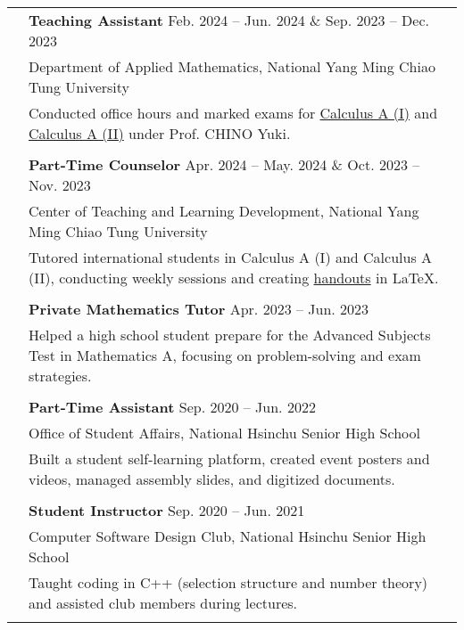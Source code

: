 \documentclass[letterpaper, 11pt]{article}
\begin{document}
\begin{center}
\begin{longtable}{p{0.76in}p{5.93in}}
        & \textbf{Teaching Assistant}  \hfill Feb. 2024 -- Jun. 2024 \& Sep. 2023 -- Dec. 2023 \\
        & Department of Applied Mathematics, National Yang Ming Chiao Tung University\\
        & Conducted office hours and marked exams for \href{https://reurl.cc/Djp5jN}{Calculus A (I)} and \href{https://reurl.cc/RqoMez}{Calculus A (II)} under Prof. CHINO Yuki.\\
        & \\

        & \textbf{Part-Time Counselor} \hfill Apr. 2024 -- May. 2024 \& Oct. 2023 -- Nov. 2023 \\
        & Center of Teaching and Learning Development, National Yang Ming Chiao Tung University\\
        & Tutored international students in Calculus A (I) and Calculus A (II), conducting weekly sessions and creating \href{https://github.com/eiken59/2024_II_Tutor}{handouts} in \LaTeX.\\
        & \\

        & \textbf{Private Mathematics Tutor} \hfill Apr. 2023 -- Jun. 2023 \\
        & Helped a high school student prepare for the Advanced Subjects Test in Mathematics A, focusing on problem-solving and exam strategies.\\
        & \\

        & \textbf{Part-Time Assistant} \hfill Sep. 2020 -- Jun. 2022 \\
        & Office of Student Affairs, National Hsinchu Senior High School\\
        & Built a student self-learning platform, created event posters and videos, managed assembly slides, and digitized documents.\\
        & \\

        & \textbf{Student Instructor} \hfill Sep. 2020 -- Jun. 2021 \\
        & Computer Software Design Club, National Hsinchu Senior High School\\
        & Taught coding in C++ (selection structure and number theory) and assisted club members during lectures.\\
        & \\

        

\end{longtable}
\end{center}
\end{document}
